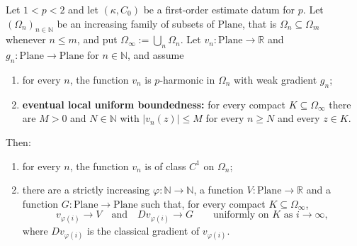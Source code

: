 \begin{lemma}
Let $1<p<2$ and let $(\kappa,C_0)$ be a first-order estimate datum for $p$.  Let
$(\Omega_n)_{n\in\mathbb{N}}$ be an increasing family of subsets of $\mathrm{Plane}$, that is
$\Omega_n\subseteq\Omega_m$ whenever $n\le m$, and put
$\Omega_\infty:=\bigcup_{n}\Omega_n$.  Let $v_n\colon\mathrm{Plane}\to\mathbb{R}$ and
$g_n\colon\mathrm{Plane}\to\mathrm{Plane}$ for $n\in\mathbb{N}$, and assume
\begin{enumerate}
\item for every $n$, the function $v_n$ is $p$-harmonic in $\Omega_n$ with weak gradient $g_n$;
\item \textbf{eventual local uniform boundedness:} for every compact $K\subseteq\Omega_\infty$
there are $M>0$ and $N\in\mathbb{N}$ with $\lvert v_n(z)\rvert\le M$ for every $n\ge N$ and every
$z\in K$.
\end{enumerate}
Then:
\begin{enumerate}
\item[(a)] for every $n$, the function $v_n$ is of class $C^{1}$ on $\Omega_n$;
\item[(b)] there are a strictly increasing $\varphi\colon\mathbb{N}\to\mathbb{N}$, a function
$V\colon\mathrm{Plane}\to\mathbb{R}$ and a function $G\colon\mathrm{Plane}\to\mathrm{Plane}$
such that, for every compact $K\subseteq\Omega_\infty$,
\[
  v_{\varphi(i)}\longrightarrow V
  \quad\text{and}\quad
  Dv_{\varphi(i)}\longrightarrow G
  \qquad\text{uniformly on }K\text{ as }i\to\infty,
\]
where $Dv_{\varphi(i)}$ is the classical gradient of $v_{\varphi(i)}$.
\end{enumerate}
\end{lemma}

